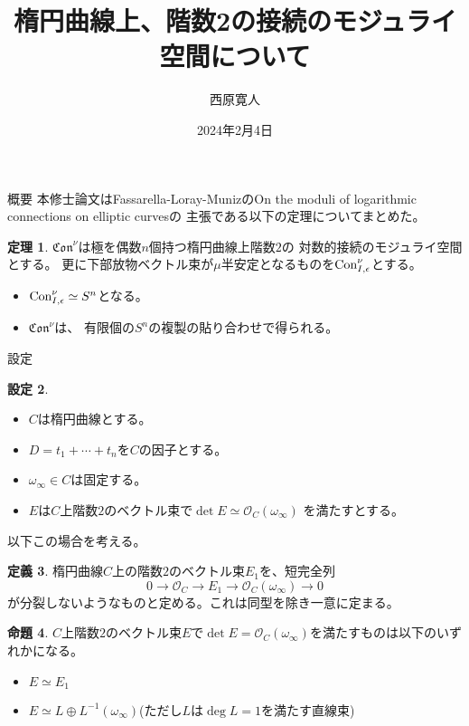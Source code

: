 \documentclass[dvipdfmx,notheorems]{beamer}
\title{楕円曲線上、階数2の接続のモジュライ空間について}
\author{西原寛人}
\date{2024年2月4日}
\theoremstyle{definition}
\newtheorem{definition}{定義}
\newtheorem{thm}[definition]{定理}
\newtheorem{prop}[definition]{命題}
\newtheorem{stg}[definition]{設定}
\begin{document}
\begin{frame}
    \maketitle
\end{frame}

\begin{frame}{概要}
    本修士論文はFassarella-Loray-MunizのOn the moduli of logarithmic connections on elliptic curvesの
    主張である以下の定理についてまとめた。
    \begin{thm}
        $\mathfrak{Con}^\nu$は極を偶数$n$個持つ楕円曲線上階数$2$の
        対数的接続のモジュライ空間とする。
        更に下部放物ベクトル束が$\mu$半安定となるものを${\rm Con}^\nu_{I,\epsilon}$とする。
        \begin{itemize}
            \item ${\rm Con}^\nu_{I,\epsilon} \simeq S^n$となる。
            \item $\mathfrak{Con}^\nu$は、
            有限個の$S^n$の複製の貼り合わせで得られる。
        \end{itemize}
    \end{thm}
\end{frame}


\begin{frame}{設定}
    \begin{stg}
        \begin{itemize}
            \item $C$は楕円曲線とする。
            \item $D=t_1+ \cdots + t_n$を$C$の因子とする。
            \item $\omega_\infty \in C$は固定する。
            \item $E$は$C$上階数$2$のベクトル束で$\det E \simeq \mathscr{O}_C(\omega_\infty)$
            を満たすとする。
        \end{itemize}
    \end{stg}
    以下この場合を考える。
\end{frame}

\begin{frame}
    \begin{definition}
        楕円曲線$C$上の階数$2$のベクトル束$E_1$を、短完全列
        $$0\rightarrow \mathscr{O}_C \rightarrow E_1 \rightarrow \mathscr{O}_C (\omega_\infty)\rightarrow 0$$
        が分裂しないようなものと定める。これは同型を除き一意に定まる。
    \end{definition}
    \begin{prop}
        $C$上階数$2$のベクトル束$E$で$\det E = \mathscr{O}_C(\omega_\infty)$を満たすものは以下のいずれかになる。
        \begin{itemize}
            \item $E\simeq E_1$
            \item $E\simeq L\oplus L^{-1}(\omega_\infty)$(ただし$L$は$\deg L = 1$を満たす直線束)
        \end{itemize}
    \end{prop}
\end{frame}
\end{document}
